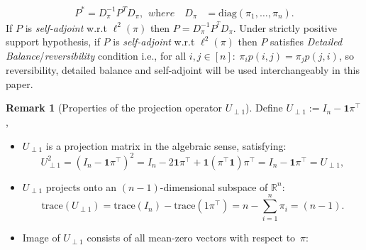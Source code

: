 \documentclass[preprint]{imsart}
\theoremstyle{plain}
\theoremstyle{definition}
\newtheorem{remark}{Remark}
\begin{document}
\begin{align}
    \label{eq:P_l2_adj}
    P^{*}=D_{\pi}^{-1}P^{T}D_{\pi}, \hspace{5pt}\textit{where} \quad 
    D_{\pi} &=\mathrm{diag}(\pi_{1},\ldots,\pi_{n}).
\end{align}
If $P$ is \emph{self-adjoint} w.r.t $\ell^{2}(\pi)$  then $P=D_{\pi}^{-1}P^{^{T}}D_{\pi}$. Under strictly positive support hypothesis, if $P$ is \emph{self-adjoint} w.r.t $\ell^{2}(\pi)$ then $P$ satisfies \emph{Detailed Balance}/\emph{reversibility} condition i.e., for all $i,j \in [n]: \hspace{3pt} \pi_{i}p(i,j)=\pi_{j}p(j,i)$, so reversibility, detailed balance and self-adjoint will be used interchangeably in this paper.

\begin{remark}[Properties of the projection operator $U_{\perp 1}$]
Define $U_{\perp 1} := I_{n} - \mathbf{1}\pi^{\top}$,
\begin{itemize}
    \item $U_{\perp 1}$ is a projection matrix in the algebraic sense, satisfying:
        \[
            U_{\perp 1}^{2} = (I_{n} - \mathbf{1}\pi^{\top})^{2}
            = I_{n} - 2\mathbf{1}\pi^{\top} + \mathbf{1}(\pi^{\top}\mathbf{1})\pi^{\top}
            = I_{n} - \mathbf{1}\pi^{\top} = U_{\perp 1},
        \]
    \item $U_{\perp 1}$ projects onto an $(n-1)$-dimensional
    subspace of $\mathbb{R}^{n}$:
        \[
            \mathrm{trace}(U_{\perp 1})= \mathrm{trace}(I_{n})-\mathrm{trace}(1\pi^{\top})=n-\sum_{i=1}^{n}\pi_{i}=(n-1).   
        \]
    
    \item Image of $U_{\perp 1}$ consists of all mean-zero vectors with respect to~$\pi$: 
    

\end{itemize}
\end{remark}
\end{document}
